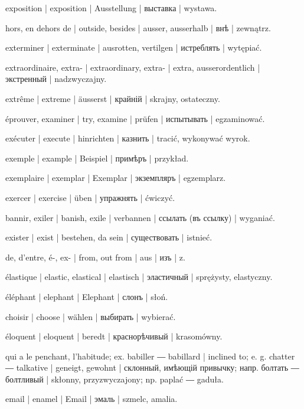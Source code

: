 \begin{outdent}{1em}
exposition | exposition | Ausstellung | выставка | wystawa.

hors, en dehors de | outside, besides | ausser, ausserhalb | внѣ | zewnątrz.

exterminer | exterminate | ausrotten, vertilgen | истреблять | wytępiać.

extraordinaire, extra- | extraordinary, extra- | extra,
ausserordentlich | экстренный | nadzwyczajny.

extrême | extreme | äusserst | крайній | skrajny, ostateczny.

éprouver, examiner | try, examine | prüfen | испытывать | egzaminować.

exécuter | execute | hinrichten | казнить | tracić,
wykonywać wyrok.

exemple | example | Beispiel | примѣръ | przykład.

exemplaire | exemplar | Exemplar | экземпляръ | egzemplarz.

exercer | exercise | üben | упражнять | ćwiczyć.

bannir, exiler | banish, exile | verbannen | ссылать
(въ ссылку) | wyganiać.

exister | exist | bestehen, da sein | существовать | istnieć.

de, d’entre, é-, ex- | from, out from | aus | изъ | z.

élastique | elastic, elastical | elastisch | эластичный | sprężysty, elastyczny.

éléphant | elephant | Elephant | слонъ | słoń.

choisir | choose | wählen | выбирать | wybierać.

éloquent | eloquent | beredt | краснорѣчивый | krasomówny.

qui a le penchant, l’habitude; ex.  babiller ―
 babillard | inclined to; e. g.  chatter ―
 talkative | geneigt, gewohnt | склонный, имѣющій привычку;
напр.  болтать ―  болтливый | skłonny,
przyzwyczajony; np.  paplać ―  gaduła.

email | enamel | Email | эмаль | szmelc, amalia.


\end{outdent}
